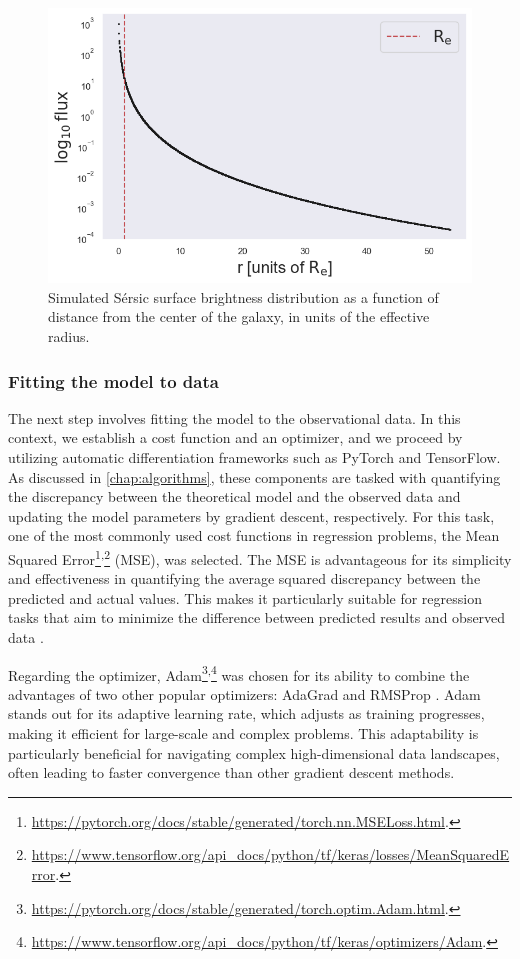 \begin{figure}
    \centering
    \includegraphics[width=0.8\linewidth, keepaspectratio]{img//chapter5/sersic/0_flux_r.png}
    \caption[Simulated Sérsic surface brightness vs radius]{Simulated Sérsic surface brightness distribution as a function of distance from the center of the galaxy, in units of the effective radius.}
    \label{fig:0_flux}
\end{figure}

\subsubsection{Fitting the model to data}

The next step involves fitting the model to the observational data. In this context, we establish a cost function and an optimizer, and we proceed by utilizing automatic differentiation frameworks such as PyTorch and TensorFlow. As discussed in \cref{chap:algorithms}, these components are tasked with quantifying the discrepancy between the theoretical model and the observed data and updating the model parameters by gradient descent, respectively. For this task, one of the most commonly used cost functions in regression problems, the Mean Squared Error\footnote{\url{https://pytorch.org/docs/stable/generated/torch.nn.MSELoss.html}.}\textsuperscript{,}\footnote{\url{https://www.tensorflow.org/api_docs/python/tf/keras/losses/MeanSquaredError}.} (MSE), was selected. The MSE is advantageous for its simplicity and effectiveness in quantifying the average squared discrepancy between the predicted and actual values. This makes it particularly suitable for regression tasks that aim to minimize the difference between predicted results and observed data \citep{berger_statistical_2006}.

Regarding the optimizer, Adam\footnote{\url{https://pytorch.org/docs/stable/generated/torch.optim.Adam.html}.}\textsuperscript{,}\footnote{\url{https://www.tensorflow.org/api_docs/python/tf/keras/optimizers/Adam}.} \citep{kingma_adam_2017} was chosen for its ability to combine the advantages of two other popular optimizers: AdaGrad and RMSProp \citep{tieleman_rmsprop_2014}. Adam stands out for its adaptive learning rate, which adjusts as training progresses, making it efficient for large-scale and complex problems. This adaptability is particularly beneficial for navigating complex high-dimensional data landscapes, often leading to faster convergence than other gradient descent methods.


